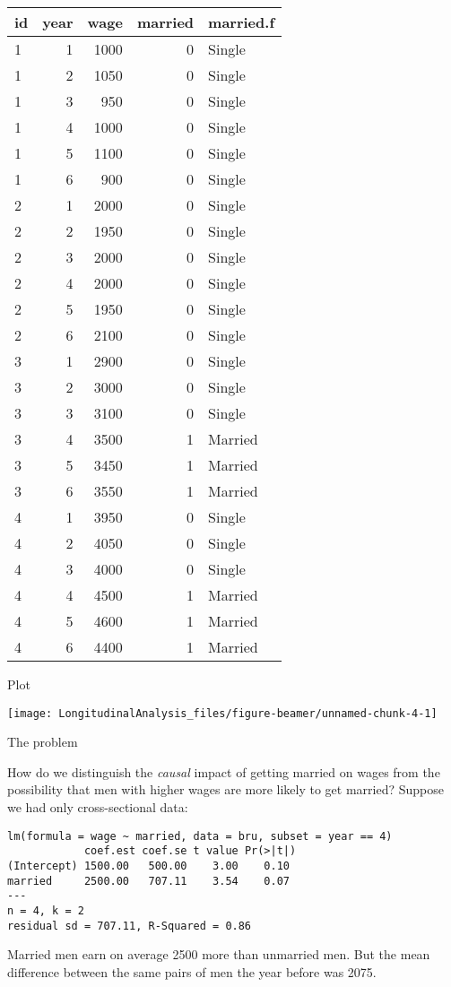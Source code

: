 \documentclass[10pt,ignorenonframetext,]{beamer}
\begin{document}
\begin{longtable}[]{@{}lrrrl@{}}
\toprule
id & year & wage & married & married.f\tabularnewline
\midrule
\endhead
1 & 1 & 1000 & 0 & Single\tabularnewline
1 & 2 & 1050 & 0 & Single\tabularnewline
1 & 3 & 950 & 0 & Single\tabularnewline
1 & 4 & 1000 & 0 & Single\tabularnewline
1 & 5 & 1100 & 0 & Single\tabularnewline
1 & 6 & 900 & 0 & Single\tabularnewline
2 & 1 & 2000 & 0 & Single\tabularnewline
2 & 2 & 1950 & 0 & Single\tabularnewline
2 & 3 & 2000 & 0 & Single\tabularnewline
2 & 4 & 2000 & 0 & Single\tabularnewline
2 & 5 & 1950 & 0 & Single\tabularnewline
2 & 6 & 2100 & 0 & Single\tabularnewline
3 & 1 & 2900 & 0 & Single\tabularnewline
3 & 2 & 3000 & 0 & Single\tabularnewline
3 & 3 & 3100 & 0 & Single\tabularnewline
3 & 4 & 3500 & 1 & Married\tabularnewline
3 & 5 & 3450 & 1 & Married\tabularnewline
3 & 6 & 3550 & 1 & Married\tabularnewline
4 & 1 & 3950 & 0 & Single\tabularnewline
4 & 2 & 4050 & 0 & Single\tabularnewline
4 & 3 & 4000 & 0 & Single\tabularnewline
4 & 4 & 4500 & 1 & Married\tabularnewline
4 & 5 & 4600 & 1 & Married\tabularnewline
4 & 6 & 4400 & 1 & Married\tabularnewline
\bottomrule
\end{longtable}

\begin{frame}{Plot}

\begin{center}\texttt{[image: LongitudinalAnalysis\_files/figure-beamer/unnamed-chunk-4-1]} \end{center}

\end{frame}

\begin{frame}[fragile]{The problem}

How do we distinguish the \emph{causal} impact of getting married on
wages from the possibility that men with higher wages are more likely to
get married? Suppose we had only cross-sectional data:

\begin{verbatim}
lm(formula = wage ~ married, data = bru, subset = year == 4)
            coef.est coef.se t value Pr(>|t|)
(Intercept) 1500.00   500.00    3.00    0.10 
married     2500.00   707.11    3.54    0.07 
---
n = 4, k = 2
residual sd = 707.11, R-Squared = 0.86
\end{verbatim}

Married men earn on average 2500 more than unmarried men. But the mean
difference between the same pairs of men the year before was 2075.

\end{frame}
\end{document}

